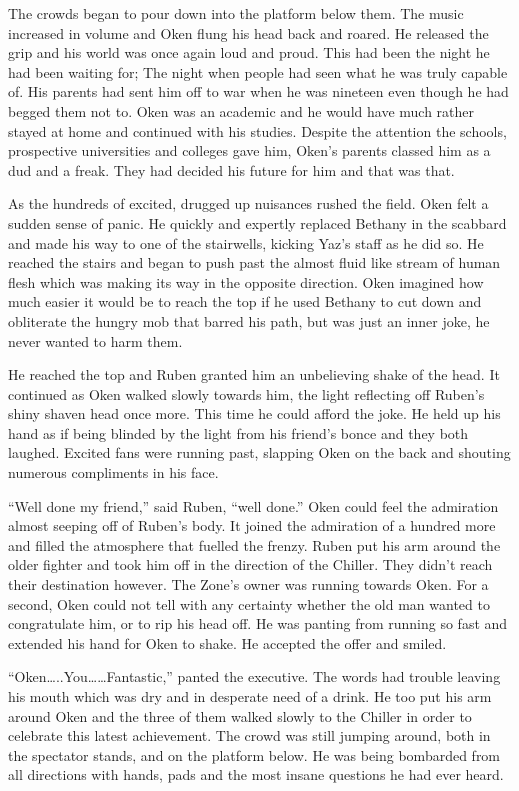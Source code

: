 The crowds began to pour down into the platform below them.  The music increased in volume and Oken flung his head back and roared.  He released the grip and his world was once again loud and proud.  This had been the night he had been waiting for; The night when people had seen what he was truly capable of.  His parents had sent him off to war when he was nineteen even though he had begged them not to.  Oken was an academic and he would have much rather stayed at home and continued with his studies.  Despite the attention the schools, prospective universities and colleges gave him, Oken's parents classed him as a dud and a freak.  They had decided his future for him and that was that.

As the hundreds of excited, drugged up nuisances rushed the field.  Oken felt a sudden sense of panic.  He quickly and expertly replaced Bethany in the scabbard and made his way to one of the stairwells, kicking Yaz's staff as he did so.  He reached the stairs and began to push past the almost fluid like stream of human flesh which was making its way in the opposite direction.  Oken imagined how much easier it would be to reach the top if he used Bethany to cut down and obliterate the hungry mob that barred his path, but was just an inner joke, he never wanted to harm them.

He reached the top and Ruben granted him an unbelieving shake of the head.  It continued as Oken walked slowly towards him, the light reflecting off Ruben's shiny shaven head once more.  This time he could afford the joke.  He held up his hand as if being blinded by the light from his friend's bonce and they both laughed.  Excited fans were running past, slapping Oken on the back and shouting numerous compliments in his face.  

``Well done my friend,'' said Ruben, ``well done.''  Oken could feel the admiration almost seeping off of Ruben's body.  It joined the admiration of a hundred more and filled the atmosphere that fuelled the frenzy.  Ruben put his arm around the older fighter and took him off in the direction of the Chiller.  They didn't reach their destination however.  The Zone's owner was running towards Oken.  For a second, Oken could not tell with any certainty whether the old man wanted to congratulate him, or to rip his head off.  He was panting from running so fast and extended his hand for Oken to shake.  He accepted the offer and smiled.

``Oken…..You……Fantastic,'' panted the executive.  The words had trouble leaving his mouth which was dry and in desperate need of a drink.  He too put his arm around Oken and the three of them walked slowly to the Chiller in order to celebrate this latest achievement.  The crowd was still jumping around, both in the spectator stands, and on the platform below.  He was being bombarded from all directions with hands, pads and the most insane questions he had ever heard.

